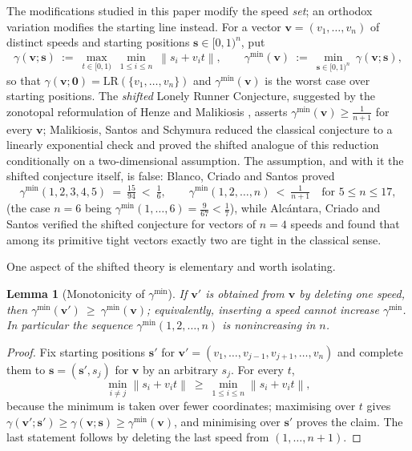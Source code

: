 \documentclass[11pt]{article}
\newtheorem{lemma}[theorem]{Lemma}
\theoremstyle{definition}
\newcommand{\LR}{\mathrm{LR}}
\newcommand{\norm}[1]{\left\lVert #1 \right\rVert}
\begin{document}
The modifications studied in this paper modify the speed \emph{set}; an
orthodox variation modifies the starting line instead.  For a vector
$\mathbf v=(v_1,\dots,v_n)$ of distinct speeds and starting positions
$\mathbf s\in[0,1)^n$, put
\[
\gamma(\mathbf v;\mathbf s)\ :=\ \max_{t\in[0,1)}\ \min_{1\le i\le n}\
\norm{s_i+v_it},
\qquad
\gamma^{\min}(\mathbf v)\ :=\ \min_{\mathbf s\in[0,1)^n}\ \gamma(\mathbf v;\mathbf s),
\]
so that $\gamma(\mathbf v;\mathbf 0)=\LR(\{v_1,\dots,v_n\})$ and
$\gamma^{\min}(\mathbf v)$ is the worst case over starting positions.
The \emph{shifted} Lonely Runner Conjecture, suggested by the zonotopal
reformulation of Henze and Malikiosis \cite{HenzeMalikiosis2017}, asserts
$\gamma^{\min}(\mathbf v)\ge\frac1{n+1}$ for every $\mathbf v$;
Malikiosis, Santos and Schymura \cite{MalikiosisSantosSchymura2025}
reduced the classical conjecture to a linearly exponential check and
proved the shifted analogue of this reduction conditionally on a
two-dimensional assumption.  The assumption, and with it the shifted
conjecture itself, is false: Blanco, Criado and Santos
\cite{BlancoCriadoSantos2026} proved\[
\gamma^{\min}(1,2,3,4,5)\ =\ \tfrac{15}{94}\ <\ \tfrac16,
\qquad
\gamma^{\min}(1,2,\dots,n)\ <\ \tfrac1{n+1}\quad\text{for } 5\le n\le 17,
\]
(the case $n=6$ being $\gamma^{\min}(1,\dots,6)=\frac9{67}<\frac17$),
while Alc\'antara, Criado and Santos \cite{AlcantaraCriadoSantos2026}
verified the shifted conjecture for vectors of $n=4$ speeds and found
that among its primitive tight vectors exactly two are tight in the
classical sense.

One aspect of the shifted theory is elementary and worth isolating.

\begin{lemma}[Monotonicity of $\gamma^{\min}$]\label{lem:shiftmono}
If $\mathbf v'$ is obtained from $\mathbf v$ by deleting one speed, then
$\gamma^{\min}(\mathbf v')\ \ge\ \gamma^{\min}(\mathbf v)$; equivalently,
inserting a speed cannot increase $\gamma^{\min}$.  In particular the
sequence $\gamma^{\min}(1,2,\dots,n)$ is nonincreasing in $n$.
\end{lemma}

\begin{proof}
Fix starting positions $\mathbf s'$ for $\mathbf v'=(v_1,\dots,v_{j-1},
v_{j+1},\dots,v_n)$ and complete them to $\mathbf s=(\mathbf s',s_j)$
for $\mathbf v$ by an arbitrary $s_j$.  For every $t$,
\[
\min_{i\ne j}\norm{s_i+v_it}\ \ge\ \min_{1\le i\le n}\norm{s_i+v_it},
\]
because the minimum is taken over fewer coordinates; maximising over $t$
gives $\gamma(\mathbf v';\mathbf s')\ge\gamma(\mathbf v;\mathbf s)
\ge\gamma^{\min}(\mathbf v)$, and minimising over $\mathbf s'$ proves the
claim.  The last statement follows by deleting the last speed from
$(1,\dots,n+1)$.
\end{proof}
\end{document}
